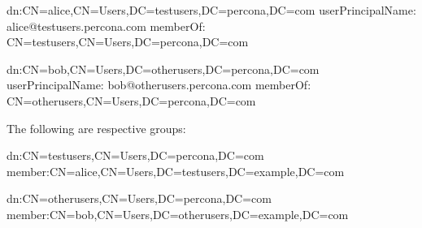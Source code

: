\documentclass[letterpaper,10pt,english]{sphinxmanual}
\begin{document}
\begin{sphinxVerbatim}[commandchars=\\\{\}]
dn:CN=alice,CN=Users,DC=testusers,DC=percona,DC=com
userPrincipalName: alice@testusers.percona.com
memberOf: CN=testusers,CN=Users,DC=percona,DC=com

dn:CN=bob,CN=Users,DC=otherusers,DC=percona,DC=com
userPrincipalName: bob@otherusers.percona.com
memberOf: CN=otherusers,CN=Users,DC=percona,DC=com
\end{sphinxVerbatim}

\sphinxAtStartPar
The following are respective  groups:

\begin{sphinxVerbatim}[commandchars=\\\{\}]
dn:CN=testusers,CN=Users,DC=percona,DC=com
member:CN=alice,CN=Users,DC=testusers,DC=example,DC=com

dn:CN=otherusers,CN=Users,DC=percona,DC=com
member:CN=bob,CN=Users,DC=otherusers,DC=example,DC=com
\end{sphinxVerbatim}
\end{document}
